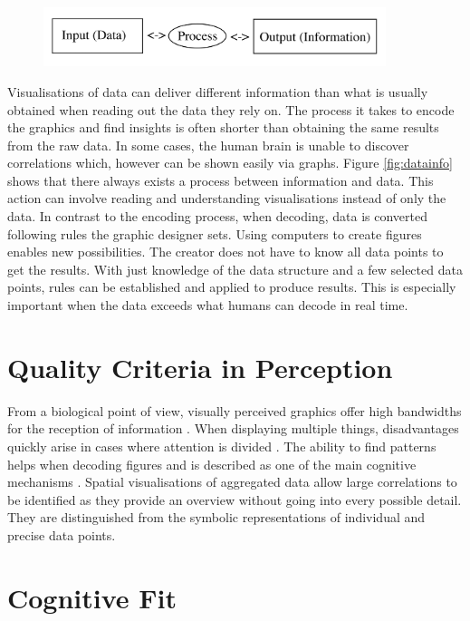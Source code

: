 \begin{figure}[caption={The process between data and information}, label={fig:datainfo}]
	\includegraphics[width=10cm]{figures/di.jpg}
\end{figure}

Visualisations of data can deliver different information than what is usually obtained when reading out the data they rely on. The process it takes to encode the graphics and find insights is often shorter than obtaining the same results from the raw data. In some cases, the human brain is unable to discover correlations which, however can be shown easily via graphs. Figure \ref{fig:datainfo} shows that there always exists a process between information and data. This action can involve reading and understanding visualisations instead of only the data. In contrast to the encoding process, when decoding, data is converted following rules the graphic designer sets. Using computers to create figures enables new possibilities. The creator does not have to know all data points to get the results. With just knowledge of the data structure and a few selected data points, rules can be established and applied to produce results. This is especially important when the data exceeds what humans can decode in real time.

\section{Quality Criteria in Perception}

From a biological point of view, visually perceived graphics offer high bandwidths for the reception of information \citep{wilkinson2016}. When displaying multiple things, disadvantages quickly arise in cases where attention is divided \citep{cohen2016}. The ability to find patterns helps when decoding figures and is described as one of the main cognitive mechanisms \citep{keller2005}. Spatial visualisations of aggregated data allow large correlations to be identified as they provide an overview without going into every possible detail. They are distinguished from the symbolic representations of individual and precise data points.

\section*{Cognitive Fit}

